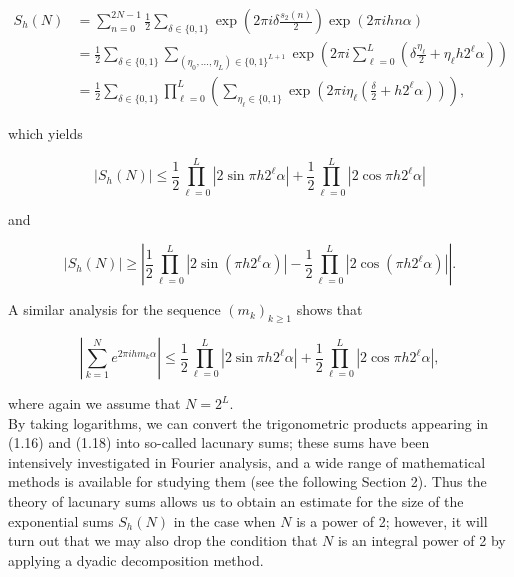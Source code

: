 \documentclass[10pt]{article}
\newcommand{\1}{\mathbf{1}}
\begin{document}
$$
\begin{aligned}
S_{h}(N) & =\sum_{n=0}^{2 N-1} \frac{1}{2} \sum_{\delta \in\{0,1\}} \exp \left(2 \pi i \delta \frac{s_{2}(n)}{2}\right) \exp (2 \pi i h n \alpha) \\
& =\frac{1}{2} \sum_{\delta \in\{0,1\}} \sum_{\left(\eta_{0}, \ldots, \eta_{L}\right) \in\{0,1\}^{L+1}} \exp \left(2 \pi i \sum_{\ell=0}^{L}\left(\delta \frac{\eta_{\ell}}{2}+\eta_{\ell} h 2^{\ell} \alpha\right)\right) \\
& =\frac{1}{2} \sum_{\delta \in\{0,1\}} \prod_{\ell=0}^{L}\left(\sum_{\eta_{\ell} \in\{0,1\}} \exp \left(2 \pi i \eta_{\ell}\left(\frac{\delta}{2}+h 2^{\ell} \alpha\right)\right)\right),
\end{aligned}
$$

which yields


\begin{equation*}
\left|S_{h}(N)\right| \leqslant \frac{1}{2} \prod_{\ell=0}^{L}\left|2 \sin \pi h 2^{\ell} \alpha\right|+\frac{1}{2} \prod_{\ell=0}^{L}\left|2 \cos \pi h 2^{\ell} \alpha\right| \tag{1.16}
\end{equation*}


and


\begin{equation*}
\left|S_h(N)\right|\geqslant
\left|\frac12\prod_{\ell=0}^{L}\left|2\sin\!\left(\pi h2^\ell\alpha\right)\right|
-\frac12\prod_{\ell=0}^{L}\left|2\cos\!\left(\pi h2^\ell\alpha\right)\right|\right|.
\tag{1.17}
\end{equation*}


A similar analysis for the sequence $\left(m_{k}\right)_{k \geqslant 1}$ shows that


\begin{equation*}
\left|\sum_{k=1}^{N} e^{2 \pi i h m_{k} \alpha}\right| \leqslant \frac{1}{2} \prod_{\ell=0}^{L}\left|2 \sin \pi h 2^{\ell} \alpha\right|+\frac{1}{2} \prod_{\ell=0}^{L}\left|2 \cos \pi h 2^{\ell} \alpha\right|, \tag{1.18}
\end{equation*}


where again we assume that $N=2^{L}$.\\
By taking logarithms, we can convert the trigonometric products appearing in (1.16) and (1.18) into so-called lacunary sums; these sums have been\\
intensively investigated in Fourier analysis, and a wide range of mathematical methods is available for studying them (see the following Section 2). Thus the theory of lacunary sums allows us to obtain an estimate for the size of the exponential sums $S_{h}(N)$ in the case when $N$ is a power of 2; however, it will turn out that we may also drop the condition that $N$ is an integral power of 2 by applying a dyadic decomposition method.
\end{document}
